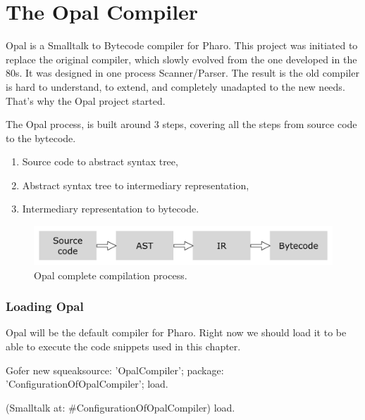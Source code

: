 \documentclass[a4paper,10pt,twoside]{book}
\begin{document}
	\sloppy
\fi


\newcommand{\opal}[0]{Opal\xspace} %
\chapter{The Opal Compiler} 


\opal is a Smalltalk to Bytecode compiler for Pharo. This project was initiated to replace the original compiler, which slowly evolved from the one developed in the 80s. It was designed in one process Scanner/Parser. The result is the old compiler is hard to understand, to extend, and completely unadapted to the new needs. That's why the \opal project started. 

The \opal process, is built around 3 steps, covering all the steps from source code to the bytecode.

\begin{enumerate}
\item Source code to abstract syntax tree,
\item Abstract syntax tree to intermediary representation,
\item Intermediary representation to bytecode.
\end{enumerate}

\begin{figure}[ht]\centering
	\includegraphics[width=\linewidth]{fullProcess}
	\caption{\opal complete compilation process. }
\end{figure}


\subsection{Loading Opal}

\opal will be the default compiler for Pharo. Right now we should load it to be able to execute the code snippets used in this chapter.

\begin{code}{}
	Gofer new
		squeaksource: 'OpalCompiler';
		package: 'ConfigurationOfOpalCompiler';
		load.
		
	(Smalltalk at: #ConfigurationOfOpalCompiler) load.
\end{code}
\end{document}
